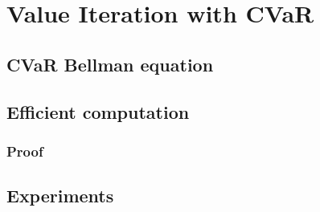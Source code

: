 \chapter{Value Iteration with CVaR}\label{ch:introduction}



\section{CVaR Bellman equation}


\section{Efficient computation}

\subsection{Proof}


\section{Experiments}



